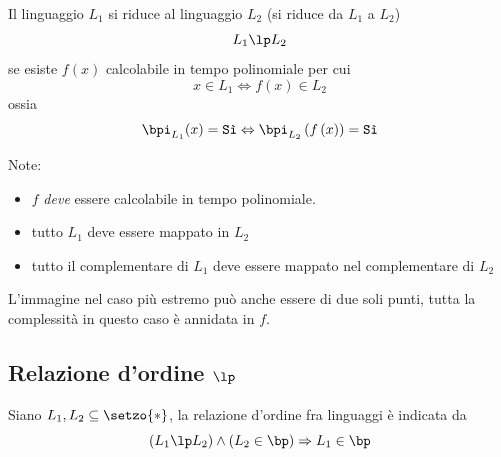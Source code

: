 \begin{definition}[Riducibilità]
    \label{def:riducibilita}
    Il linguaggio $L_1$ si riduce al linguaggio $L_2$ (si riduce da $L_1$ a $L_2$)
    \begin{equation*}
        L_1 \lp L_2
    \end{equation*}
    se esiste $f(x)$ calcolabile in tempo polinomiale per cui
    \begin{equation*}
        x \in L_1 \Leftrightarrow f(x) \in L_2
    \end{equation*}
    ossia
    \begin{equation*}
        \bpi_{L_{1}} (x) = \texttt{Sì}
        \Leftrightarrow
        \bpi_{L_{2}} \left( f\left( x \right) \right) = \texttt{Sì}
    \end{equation*}
\end{definition}
\noindent
Note: 
\begin{itemize}[noitemsep,parsep=0pt,partopsep=0pt,topsep=0pt]
    \item $f$ \emph{deve} essere calcolabile in tempo polinomiale.
    \item tutto $L_1$ deve essere mappato in $L_2$
    \item tutto il complementare di $L_1$ deve essere mappato nel complementare di $L_2$
\end{itemize}
L'immagine nel caso più estremo può anche essere di due soli punti, tutta la complessità in questo caso è annidata in $f$.

\subsection{Relazione d'ordine $\lp$}
\label{sss:relazioneordinelp}

\begin{theorem}
    \label{teo:relazioneordine}
    Siano $L_1, L_2 \subseteq \setzo{*}$, la relazione d'ordine fra linguaggi è indicata da
    \begin{equation*}
        \left( L_1 \lp L_2 \right) \wedge \left( L_2 \in \bp \right) \Rightarrow L_1 \in \bp
    \end{equation*}
\end{theorem}

